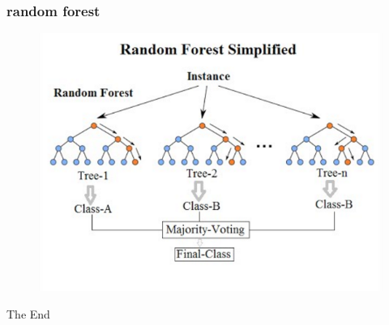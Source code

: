 \documentclass{beamer}
\begin{document}
\begin{frame}
\frametitle{random forest}
\begin{figure}
\includegraphics[width = 0.9\linewidth]{figures/04/01_classification/random_forest.png}
\end{figure}

\end{frame}







\begin{frame}
\Huge{\centerline{The End}}
\end{frame}

\end{document}
